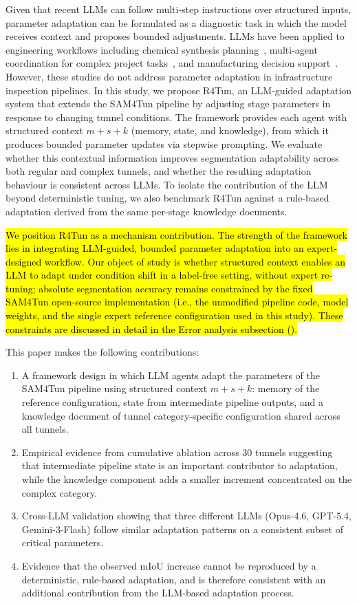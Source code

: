 \documentclass[a4paper,fleqn]{cas-dc}
\begin{document}
{Given that recent LLMs can follow multi-step instructions over structured inputs, parameter adaptation can be formulated as a diagnostic task in which the model receives context and proposes bounded adjustments. LLMs have been applied to engineering workflows including chemical synthesis planning~\citep{bran2024chemcrow}, multi-agent coordination for complex project tasks~\citep{qian2024chatdev, hong2024metagpt, chen2024comm}, and manufacturing decision support~\citep{garcia2024manufacturing}. However, these studies do not address parameter adaptation in infrastructure inspection pipelines. In this study, we propose R4Tun, an LLM-guided adaptation system that extends the SAM4Tun pipeline by adjusting stage parameters in response to changing tunnel conditions. The framework provides each agent with structured context $m+s+k$ (memory, state, and knowledge), from which it produces bounded parameter updates via stepwise prompting. We evaluate whether this contextual information improves segmentation adaptability across both regular and complex tunnels, and whether the resulting adaptation behaviour is consistent across LLMs. To isolate the contribution of the LLM beyond deterministic tuning, we also benchmark R4Tun against a rule-based adaptation derived from the same per-stage knowledge documents.

\hl{We position R4Tun as a mechanism contribution. The strength of the framework lies in integrating LLM-guided, bounded parameter adaptation into an expert-designed workflow. Our object of study is whether structured context enables an LLM to adapt under condition shift in a label-free setting, without expert re-tuning; absolute segmentation accuracy remains constrained by the fixed SAM4Tun open-source implementation (i.e., the unmodified pipeline code, model weights, and the single expert reference configuration used in this study). These constraints are discussed in detail in the Error analysis subsection ().}

This paper makes the following contributions:
\begin{enumerate}
\item A framework design in which LLM agents adapt the parameters of the SAM4Tun pipeline using structured context $m+s+k$: memory of the reference configuration, state from intermediate pipeline outputs, and a knowledge document of tunnel category-specific configuration shared across all tunnels.
\item Empirical evidence from cumulative ablation across 30 tunnels suggesting that intermediate pipeline state is an important contributor to adaptation, while the knowledge component adds a smaller increment concentrated on the complex category.
\item Cross-LLM validation showing that three different LLMs (Opus-4.6, GPT-5.4, Gemini-3-Flash) follow similar adaptation patterns on a consistent subset of critical parameters.
\item Evidence that the observed mIoU increase cannot be reproduced by a deterministic, rule-based adaptation, and is therefore consistent with an additional contribution from the LLM-based adaptation process.
\end{enumerate}

}
\end{document}

